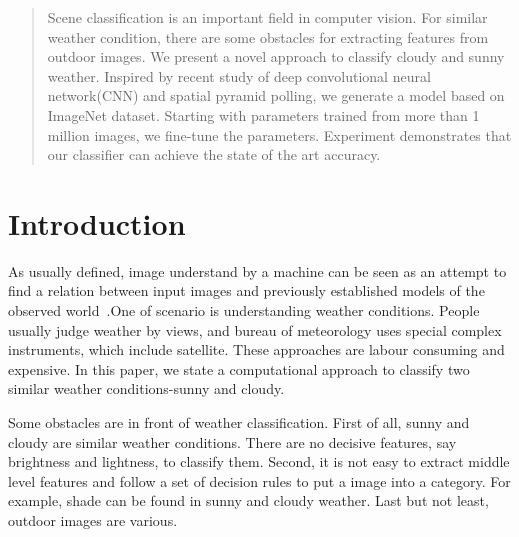 \documentclass[a0,portrait]{a0poster}
\begin{document}
\begin{multicols}{2} %




\begin{abstract}
Scene classification is an important field in computer vision. For similar weather condition, there are some obstacles for extracting features from outdoor images. We present a novel approach to classify cloudy and sunny weather. Inspired by recent study of deep convolutional neural network(CNN) and spatial pyramid polling, we generate a model based on ImageNet dataset. Starting with parameters trained from more than 1 million images, we fine-tune the parameters. Experiment demonstrates that our classifier can achieve the state of the art accuracy.
\end{abstract}

\section*{Introduction}
As usually defined, image understand by a machine can be seen as an attempt to find a relation between input images and previously established models of the observed world~\cite{sonka1998image}.One of scenario is understanding weather conditions. People usually judge weather by views, and bureau of meteorology uses special complex instruments, which include satellite. These approaches are labour consuming and expensive. In this paper, we state a computational approach to classify two similar weather conditions-sunny and cloudy.

Some obstacles are in front of weather classification. First of all, sunny and cloudy are similar weather conditions. There are no decisive features, say brightness and lightness, to classify them. Second, it is not easy to extract middle level features and follow a set of decision rules to put a image into a category. For example, shade can be found in sunny and cloudy weather. Last but not least, outdoor images are various.



\end{multicols}
\end{document}
